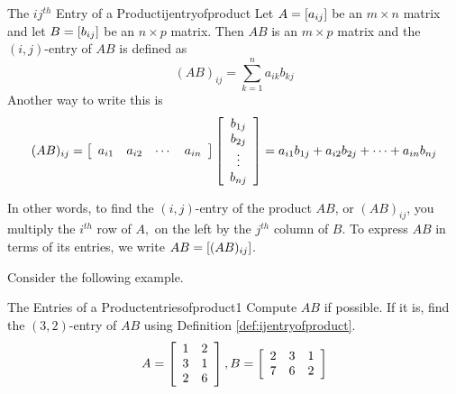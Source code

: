 \begin{definition}{The $ij^{th}$ Entry of a Product}{ijentryofproduct}
Let $A=\left[ a_{ij}\right] $ be an $m\times n$ matrix and
let $B=\left[ b_{ij}\right] $ be an $n\times p$ matrix. Then $AB$ is an 
$m\times p$ matrix and the $\left( i, j \right)$-entry of $AB$ is defined as 
\begin{equation*}
(AB)_{ij}=\sum_{k=1}^{n}a_{ik}b_{kj}  
\end{equation*}
Another way to write this is
\begin{equation*}
(AB)_{ij}=\left[
\begin{array}{cccc}
a_{i1} & a_{i2} & \cdots & a_{in}
\end{array}
\right] \left[
\begin{array}{c}
b_{1j} \\
b_{2j} \\
\vdots \\
b_{nj}
\end{array}
\right]
= 
a_{i1}b_{1j} + a_{i2}b_{2j} + \cdots + a_{in}b_{nj}
\end{equation*}
\end{definition}

In other words, to find the $\left( i, j \right)$-entry of the product $AB$, or $(AB)_{ij}$,
you multiply the $i^{th}$ row of 
$A,$ on the left by the $j^{th}$ column of $B$. To express $AB$ in terms of its entries, we write $AB = \left[ (AB)_{ij} \right]$.

Consider the following example. 

\begin{example}{The Entries of a Product}{entriesofproduct1}
Compute $AB$ if possible. If it is, find the $\left( 3,2 \right)$-entry of $AB$ using Definition \ref{def:ijentryofproduct}. 
\begin{equation*}
A = \left[
\begin{array}{cc}
1 & 2 \\
3 & 1 \\
2 & 6
\end{array}
\right], B = \left[
\begin{array}{ccc}
2 & 3 & 1 \\
7 & 6 & 2
\end{array}
\right]
\end{equation*}
\end{example}

